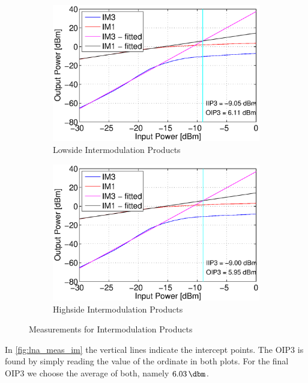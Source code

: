 \documentclass[a4paper]{article}        %
\begin{document}
  \begin{figure}[H]
    \centering
    \begin{subfigure}{0.5\textwidth}
      \centering
      \includegraphics[width=\textwidth]{fig/LNA/im_low_lna.eps}
      \caption{Lowside Intermodulation Products}
      \label{fig:lna_meas_im_low}
    \end{subfigure}%
    \begin{subfigure}{0.5\textwidth}
      \centering
      \includegraphics[width=\textwidth]{fig/LNA/im_high.eps}
      \caption{Highside Intermodulation Products}
      \label{fig:lna_meas_im_high}
    \end{subfigure}
    \caption{Measurements for Intermodulation Products}
    \label{fig:lna_meas_im}
  \end{figure}

  In \autoref{fig:lna_meas_im} the vertical lines indicate the intercept points. The OIP3 is found by simply reading the value of the ordinate in both plots. For the final OIP3 we choose the average of both, namely $\SI{6.03}{\dbm}$.
\end{document}
